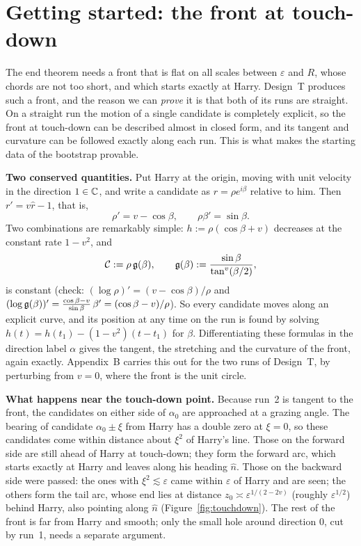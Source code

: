﻿%
\section{Getting started: the front at touch-down}\label{sec:touchdown}

The end theorem needs a front that is flat on all scales between $\varepsilon$ and $R$, whose chords are not too short,
and which starts exactly at Harry. Design~T produces such a front, and the reason we can \emph{prove} it is that both of
its runs are straight. On a straight run the motion of a single candidate is completely explicit, so the front at
touch-down can be described almost in closed form, and its tangent and curvature can be followed exactly along each
run. This is what makes the starting data of the bootstrap provable.

\textbf{Two conserved quantities.} Put Harry at the origin, moving with unit velocity in the direction $1\in\mathbb{C}$, and
write a candidate as $r=\rho e^{i\beta}$ relative to him. Then $r'=v\hat r-1$, that is,
\[
\rho'=v-\cos\beta,\qquad \rho\beta'=\sin\beta .
\]
Two combinations are remarkably simple: $h:=\rho(\cos\beta+v)$ decreases at the constant rate $1-v^2$, and
\[
\mathcal C:=\rho\,\mathfrak{g}(\beta),\qquad \mathfrak{g}(\beta):=\frac{\sin\beta}{\tan^v(\beta/2)},
\]
is constant (check: $(\log\rho)'=(v-\cos\beta)/\rho$ and $(\log\mathfrak{g}(\beta))'=\frac{\cos\beta-v}{\sin\beta}\,\beta'=
(\cos\beta-v)/\rho$). So every candidate moves along an explicit curve, and its position at any time on the run is found
by solving $h(t)=h(t_1)-(1-v^2)(t-t_1)$ for $\beta$. Differentiating these formulas in the direction label $\alpha$
gives the tangent, the stretching and the curvature of the front, again exactly. Appendix~B carries this out for the two
runs of Design~T, by perturbing from $v=0$, where the front is the unit circle.

\textbf{What happens near the touch-down point.} Because run~2 is tangent to the front, the candidates on either side of
$\alpha_0$ are approached at a grazing angle. The bearing of candidate $\alpha_0\pm\xi$ from Harry has a double zero at
$\xi=0$, so these candidates come within distance about $\xi^2$ of Harry's line. Those on the forward side are still
ahead of Harry at touch-down; they form the forward arc, which starts exactly at Harry and leaves along his heading
$\hat n$. Those on the backward side were passed: the ones with $\xi^2\lesssim\varepsilon$ came within $\varepsilon$ of
Harry and are seen; the others form the tail arc, whose end lies at distance $z_0\asymp\varepsilon^{1/(2-2v)}$
(roughly $\varepsilon^{1/2}$) behind Harry, also pointing along $\hat n$ (Figure~\ref{fig:touchdown}). The rest of the
front is far from Harry and smooth; only the small hole around direction $0$, cut by run~1, needs a separate argument.


